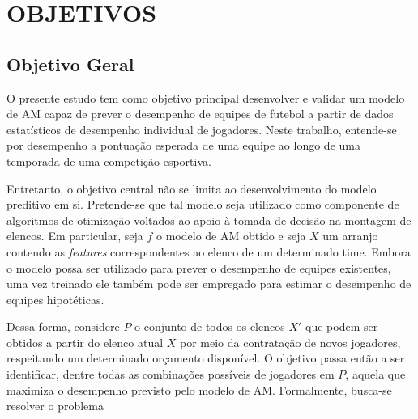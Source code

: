 \chapter{OBJETIVOS}

\section{Objetivo Geral}

O presente estudo tem como objetivo principal desenvolver e validar um 
modelo de AM capaz de prever o desempenho de 
equipes de futebol a partir de dados estatísticos de desempenho individual 
de jogadores. Neste trabalho, entende-se por desempenho a pontuação esperada 
de uma equipe ao longo de uma temporada de uma competição esportiva.

Entretanto, o objetivo central não se limita ao desenvolvimento 
do modelo preditivo em si. Pretende-se que tal modelo seja utilizado 
como componente de algoritmos de otimização voltados ao apoio à 
tomada de decisão na montagem de elencos. Em particular, seja $f$ o 
modelo de AM obtido e seja $X$ um arranjo contendo as \textit{features} 
correspondentes ao elenco de um determinado time. Embora o modelo possa 
ser utilizado para prever o desempenho de equipes existentes, uma vez 
treinado ele também pode ser empregado para estimar o desempenho de 
equipes hipotéticas.

Dessa forma, considere $P$ o conjunto de todos os elencos $X'$ que 
podem ser obtidos a partir do elenco atual $X$ por meio da contratação 
de novos jogadores, respeitando um determinado orçamento disponível. 
O objetivo passa então a ser identificar, dentre todas as combinações 
possíveis de jogadores em $P$, aquela que maximiza o desempenho 
previsto pelo modelo de AM. Formalmente, busca-se resolver o problema


